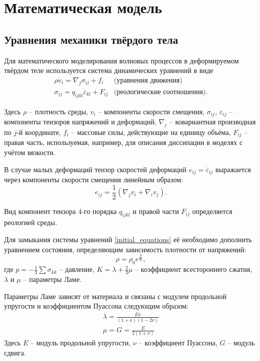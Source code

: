 \section{Математическая модель}

\subsection{Уравнения механики твёрдого тела}
Для математического моделирования волновых процессов в деформируемом твёрдом
теле используется система динамических уравнений \cite{novatsky,sedov} в виде
\begin{eqnarray}
\label{initial_equations}
\rho\dot{v}_i=\nabla_j\sigma_{ij}+f_i & \textrm{(уравнения движения)}\nonumber\\
\sigma_{ij}=q_{ijkl}\dot{\varepsilon}_{kl}+F_{ij} & \textrm{(реологические
соотношения).}
\end{eqnarray}

Здесь $\rho$ – плотность среды, $v_i$ – компоненты скорости смещения,
$\sigma_{ij}$, $\varepsilon_{ij}$ -- компоненты тензоров напряжений и деформаций,
$\nabla_j$ – ковариантная производная по $j$-й координате, $f_i$ – массовые
силы, действующие на единицу объёма, $F_{ij}$ -- правая часть, используемая, например, для описания диссипации в моделях с учётом вязкости.

В случае малых деформаций тензор скоростей деформаций $e_{ij}=\dot{\varepsilon}_{ij}$ 
выражается через компоненты скорости смещения линейным образом:
\begin{equation}
e_{ij}=\frac{1}{2}(\nabla_j v_i+\nabla_i v_j).
\end{equation}

Вид компонент тензора 4-го порядка $q_{ijkl}$ и правой части $F_{ij}$ определяется реологией среды.

Для замыкания системы уравнений \ref{initial_equations} её необходимо дополнить
уравнением состояния, определяющим зависимость плотности от напряжений:
$$\rho=\rho_0e^{\frac{p}{K}},$$
где $p=-\frac{1}{3}\sum\sigma_{kk}$ -- давление, $K=\lambda+\frac{2}{3}\mu$ --
коэффициент всестороннего сжатия, $\lambda$ и $\mu$ -- параметры Ламе.

Параметры Ламе зависят от материала и связаны с модулем продольной упругости и коэффициентом Пуассона следующим образом:
\begin{eqnarray}
\label{lame_parameters}
\lambda=\frac{E\nu}{(1+\nu)(1-2\nu)}
\nonumber\\
\mu=G=\frac{E}{2(1+\nu)}
\end{eqnarray}
Здесь $E$ -- модуль продольной упругости, $\nu$ -- коэффициент Пуассона, $G$ -- модуль сдвига.

